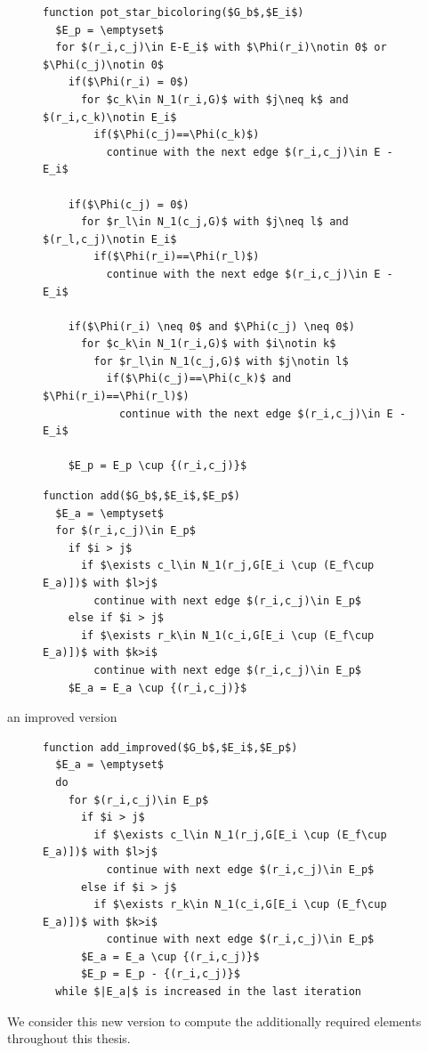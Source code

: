 \documentclass[12pt, oneside]{book}
\begin{document}
\begin{figure}
\begin{lstlisting}[caption=Find potentially required elements for star bicoloring,label=code.pot.sb,mathescape]
function pot_star_bicoloring($G_b$,$E_i$)
  $E_p = \emptyset$
  for $(r_i,c_j)\in E-E_i$ with $\Phi(r_i)\notin 0$ or $\Phi(c_j)\notin 0$ 
    if($\Phi(r_i) = 0$)
      for $c_k\in N_1(r_i,G)$ with $j\neq k$ and $(r_i,c_k)\notin E_i$
        if($\Phi(c_j)==\Phi(c_k)$)
          continue with the next edge $(r_i,c_j)\in E - E_i$

    if($\Phi(c_j) = 0$)
      for $r_l\in N_1(c_j,G)$ with $j\neq l$ and $(r_l,c_j)\notin E_i$
        if($\Phi(r_i)==\Phi(r_l)$)
          continue with the next edge $(r_i,c_j)\in E - E_i$

    if($\Phi(r_i) \neq 0$ and $\Phi(c_j) \neq 0$)
      for $c_k\in N_1(r_i,G)$ with $i\notin k$
        for $r_l\in N_1(c_j,G)$ with $j\notin l$
          if($\Phi(c_j)==\Phi(c_k)$ and $\Phi(r_i)==\Phi(r_l)$)
            continue with the next edge $(r_i,c_j)\in E - E_i$

    $E_p = E_p \cup {(r_i,c_j)}$
\end{lstlisting}
\end{figure}
\begin{figure}
\begin{lstlisting}[caption=Find additionally required elements,
label=code.add,mathescape]
function add($G_b$,$E_i$,$E_p$)
  $E_a = \emptyset$
  for $(r_i,c_j)\in E_p$
    if $i > j$
      if $\exists c_l\in N_1(r_j,G[E_i \cup (E_f\cup E_a)])$ with $l>j$
        continue with next edge $(r_i,c_j)\in E_p$
    else if $i > j$
      if $\exists r_k\in N_1(c_i,G[E_i \cup (E_f\cup E_a)])$ with $k>i$
        continue with next edge $(r_i,c_j)\in E_p$
    $E_a = E_a \cup {(r_i,c_j)}$ 
\end{lstlisting}
\end{figure}
an improved version 
\begin{figure}
\begin{lstlisting}[caption=Find additionally required elements,
label=code.add2,mathescape]
function add_improved($G_b$,$E_i$,$E_p$)
  $E_a = \emptyset$
  do
    for $(r_i,c_j)\in E_p$
      if $i > j$
        if $\exists c_l\in N_1(r_j,G[E_i \cup (E_f\cup E_a)])$ with $l>j$
          continue with next edge $(r_i,c_j)\in E_p$
      else if $i > j$
        if $\exists r_k\in N_1(c_i,G[E_i \cup (E_f\cup E_a)])$ with $k>i$
          continue with next edge $(r_i,c_j)\in E_p$
      $E_a = E_a \cup {(r_i,c_j)}$
      $E_p = E_p - {(r_i,c_j)}$
  while $|E_a|$ is increased in the last iteration
\end{lstlisting}
\end{figure}
We consider this new version to compute the additionally required elements
throughout this thesis.
\end{document}
